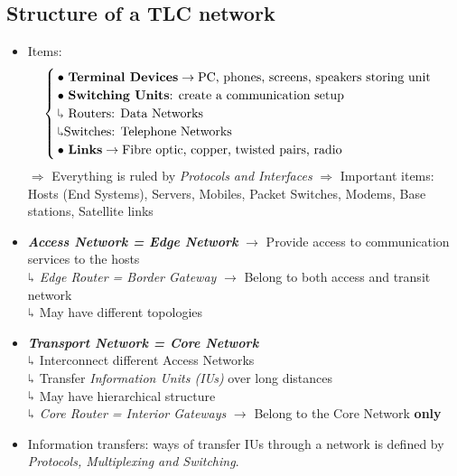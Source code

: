 \subsection{Structure of a TLC network}
\begin{itemize}
\item Items:
\begin{equation}
\begin{cases}
\bullet \text{ \textbf{Terminal Devices}} \rightarrow \text{PC, phones, screens, speakers storing unit}\\
\bullet \text{ \textbf{Switching Units}: create a communication setup } \\ \rotatebox[origin=c]{180}{$\Lsh$} \text{ Routers: Data Networks} \\ \rotatebox[origin=c]{180}{$\Lsh$} \text{Switches: Telephone Networks}\\
\bullet \text{ \textbf{Links}} \rightarrow \text{Fibre optic, copper, twisted pairs, radio}
\end{cases}
\end{equation}
$\Rightarrow$ Everything is ruled by \textit{Protocols and Interfaces}
$\Rightarrow$ Important items: Hosts (End Systems), Servers, Mobiles, Packet Switches, Modems, Base stations, Satellite links 

\item \textit{\textbf{Access Network = Edge Network}} $\rightarrow$ Provide access to communication services to the hosts\\
$\rotatebox[origin=c]{180}{$\Lsh$}$ \textit{Edge Router = Border Gateway} $\rightarrow$ Belong to both access and transit network \\ $\rotatebox[origin=c]{180}{$\Lsh$}$ May have different topologies
\item \textit{\textbf{Transport Network = Core Network}}\\ $\rotatebox[origin=c]{180}{$\Lsh$}$ Interconnect different Access Networks \\ $\rotatebox[origin=c]{180}{$\Lsh$}$ Transfer \textit{Information Units (IUs)} over long distances\\
$\rotatebox[origin=c]{180}{$\Lsh$}$ May have hierarchical structure \\ $\rotatebox[origin=c]{180}{$\Lsh$}$ \textit{Core Router = Interior Gateways} $\rightarrow$ Belong to the Core Network \textbf{only} 
\item Information transfers: ways of transfer IUs through a network is defined by \textit{Protocols, Multiplexing and Switching}.
\end{itemize}

